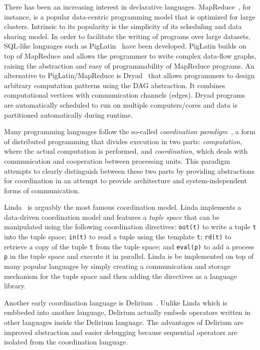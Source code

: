There has been an increasing interest in declarative 
languages. MapReduce~\cite{Dean:2008:MSD:1327452.1327492}, for instance, is a
popular data-centric programming model that is optimized for large clusters.
Intrinsic to its popularity is the simplicity of its scheduling and data sharing model.
In order to facilitate the writing of programs over large
datasets, SQL-like languages such as
PigLatin~\cite{Olston:2008:PLN:1376616.1376726} have been developed.
PigLatin builds on top of MapReduce and allows the programmer to write complex
data-flow graphs, raising the abstraction and easy of programmability of
MapReduce programs.
An alternative to PigLatin/MapReduce is
Dryad~\cite{Isard:2007:DDD:1272996.1273005}
that allows programmers to design arbitrary computation patterns using the DAG
abstraction. It combines computational vertices with communication channels
(edges). Dryad programs are automatically scheduled to run on multiple
computers/cores and data is partitioned automatically during runtime.

Many programming languages follow the so-called \emph{coordination
paradigm}~\cite{Papadopoulos98coordinationmodels}, a form of distributed
programming that divides execution in two parts: \emph{computation}, where the actual
computation is performed, and \emph{coordination}, which deals with
communication and cooperation between processing units. This paradigm attempts
to clearly distinguish between these two parts by providing abstractions for
coordination in an attempt to provide architecture and system-independent forms
of communication.  

Linda~\cite{linda} is arguably the most famous coordination model. Linda
implements a data-driven coordination model and features a \emph{tuple space}
that can be manipulated using the following coordination directives:
\texttt{out(t)} to write a tuple \texttt{t} into the tuple space; \texttt{in(t)}
to read a tuple using the template \texttt{t}; \texttt{rd(t)} to retrieve a copy of
the tuple \texttt{t} from the tuple space; and \texttt{eval(p)} to add a process
\texttt{p} in the tuple space and execute it in parallel. 
Linda is be implemented on top of many
popular languages by simply creating a communication and storage mechanism for
the tuple space and then adding the directives as a language library.

Another early coordination language is Delirium~\cite{Delirium}. Unlike
Linda which is embbeded into another language, Delirium actually embeds
operators written in other languages inside the Delirium language.
The advantages of Delirium are improved abstraction
and easier debugging because sequential operators are isolated from the
coordination language.

